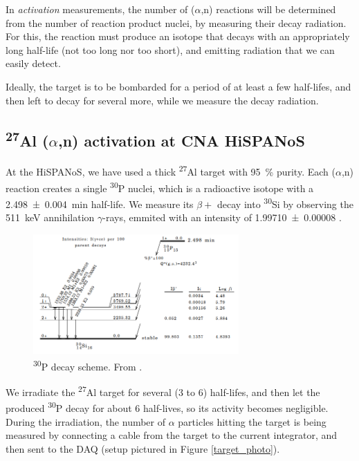 \documentclass[a4paper,12pt]{report}
\newcommand{\an}{($\alpha$,n) }
\newcommand{\Aliso}{\textsuperscript{27}Al }
\newcommand{\Piso}{\textsuperscript{30}P }
\begin{document}
In \textit{activation} measurements, the number of \an reactions will be determined from the number of reaction product nuclei, by measuring their decay radiation.
For this, the reaction must produce an isotope that decays with an appropriately long half-life (not too long nor too short), and emitting radiation that we can easily detect.

Ideally, the target is to be bombarded for a period of at least a few half-lifes, and then left to decay for several more, while we measure the decay radiation.

\subsection{\Aliso\an activation at CNA HiSPANoS}
At the HiSPANoS, we have used a thick \Aliso target with \qty{95}{\percent} purity.
Each \an reaction creates a single \Piso nuclei, which is a radioactive isotope with a \qty{2.498(4)}{\minute} half-life.
We measure its $\beta +$ decay into \textsuperscript{30}Si by observing the \qty{511}{\keV} annihilation $\gamma$-rays, emmited with an intensity of \num{1.99710(8)} \cite{nucleardatasheets}.

\begin{figure}[H]
	\centering
	\includegraphics[width=0.7\textwidth]{Piso_decay_scheme.png}
	\caption{\Piso decay scheme.
	From \cite{nucleardatasheets}.}
	\label{Piso_decay_scheme}
\end{figure}

We irradiate the \Aliso target for several (3 to 6) half-lifes, and then let the produced \Piso decay for about 6 half-lives, so its activity becomes negligible.
During the irradiation, the number of $\alpha$ particles hitting the target is being measured by connecting a cable from the target to the current integrator, and then sent to the DAQ (setup pictured in Figure \ref{target_photo}).
\end{document}
